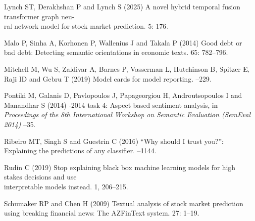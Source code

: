 \documentclass{aims}
\numberwithin{equation}{section}
\begin{document}
\begin{thebibliography}{}
\newblock Lynch ST, Derakhshan P and Lynch S (2025)
\newblock A novel hybrid temporal fusion transformer graph neu-\\
ral network model for stock market prediction.
 5: 176.
\newblock {}

\newblock Malo P, Sinha A, Korhonen P, Wallenius J and Takala P (2014)
\newblock Good debt or bad debt: Detecting semantic orientations in economic
  texts.
 65: 782--796. 

\newblock Mitchell M, Wu S, Zaldivar A, Barnes P, Vasserman L,
  Hutchinson B, Spitzer E, Raji ID and Gebru T (2019)
\newblock Model cards for model reporting.
--229. 

\newblock Pontiki M,  Galanis D, Pavlopoulos J, Papageorgiou H,
  Androutsopoulos I and Manandhar S (2014)
-2014 task 4: Aspect based sentiment analysis,
\newblock in {\em Proceedings of the 8th International Workshop on Semantic
  Evaluation (SemEval 2014)} 
--35. 

\newblock Ribeiro MT, Singh S and Guestrin C (2016)
\newblock ``Why should {I} trust you?'': Explaining the predictions of any
  classifier.
--1144. 

\newblock Rudin C (2019)
\newblock Stop explaining black box machine learning models for high stakes decisions and use\\
interpretable models instead.
 1, 206--215. 

\newblock Schumaker RP and Chen H (2009)
\newblock Textual analysis of stock market prediction using breaking financial
  news: The {AZFinText} system.
 27:
  1--19. 


\end{thebibliography}
\end{document}
